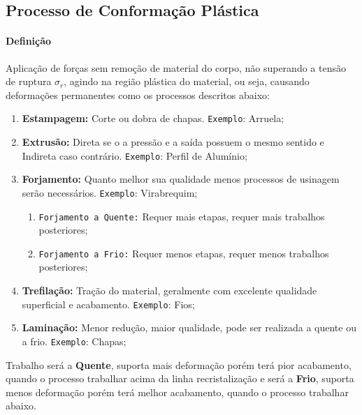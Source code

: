 \documentclass{article}
\begin{document}
        \subsection{Processo de Conformação Plástica}
            \paragraph{Definição}Aplicação de forças sem remoção de material do corpo, não superando a tensão de ruptura $\sigma_{r}$, agindo na região plástica do material, ou seja, causando deformações permanentes como os processos descritos abaixo:
                \begin{enumerate}[rightmargin = \leftmargin]
                    \item \textbf{Estampagem:} Corte ou dobra de chapas. \texttt{Exemplo}: Arruela;

                    \item \textbf{Extrusão:} Direta se o a pressão e a saída possuem o mesmo sentido e Indireta caso contrário. \texttt{Exemplo}: Perfil de Alumínio;

                    \item \textbf{Forjamento:} Quanto melhor sua qualidade menos processos de usinagem serão necessários. \texttt{Exemplo}: Virabrequim;
                        \begin{enumerate}[rightmargin = \leftmargin, noitemsep]
                            \item \texttt{Forjamento a Quente:} Requer mais etapas, requer mais trabalhos posteriores;
                            \item \texttt{Forjamento a Frio:} Requer menos etapas, requer menos trabalhos posteriores;
                        \end{enumerate}

                    \item \textbf{Trefilação:} Tração do material, geralmente com excelente qualidade superficial e acabamento. \texttt{Exemplo}: Fios;

                    \item \textbf{Laminação:} Menor redução, maior qualidade, pode ser realizada a quente ou a frio. \texttt{Exemplo}: Chapas;
                \end{enumerate}
            Trabalho será a \textbf{Quente}, suporta mais deformação porém terá pior acabamento, quando o processo trabalhar acima da linha recristalização e será a \textbf{Frio}, suporta menos deformação porém terá melhor acabamento, quando o processo trabalhar abaixo.
\end{document}
